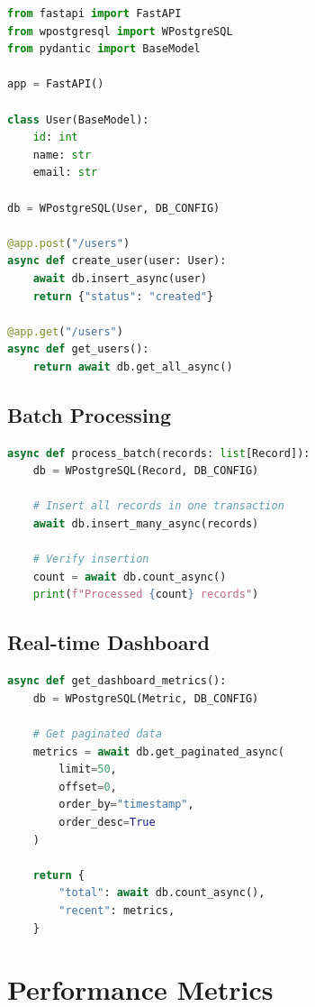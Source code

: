 \documentclass[12pt,a4paper]{report}
\begin{document}
\begin{lstlisting}[language=Python, caption=FastAPI Integration]
from fastapi import FastAPI
from wpostgresql import WPostgreSQL
from pydantic import BaseModel

app = FastAPI()

class User(BaseModel):
    id: int
    name: str
    email: str

db = WPostgreSQL(User, DB_CONFIG)

@app.post("/users")
async def create_user(user: User):
    await db.insert_async(user)
    return {"status": "created"}

@app.get("/users")
async def get_users():
    return await db.get_all_async()
\end{lstlisting}

\section{Batch Processing}

\begin{lstlisting}[language=Python, caption=Batch Processing]
async def process_batch(records: list[Record]):
    db = WPostgreSQL(Record, DB_CONFIG)
    
    # Insert all records in one transaction
    await db.insert_many_async(records)
    
    # Verify insertion
    count = await db.count_async()
    print(f"Processed {count} records")
\end{lstlisting}

\section{Real-time Dashboard}

\begin{lstlisting}[language=Python, caption=Dashboard Data]
async def get_dashboard_metrics():
    db = WPostgreSQL(Metric, DB_CONFIG)
    
    # Get paginated data
    metrics = await db.get_paginated_async(
        limit=50,
        offset=0,
        order_by="timestamp",
        order_desc=True
    )
    
    return {
        "total": await db.count_async(),
        "recent": metrics,
    }
\end{lstlisting}

\chapter{Performance Metrics}
\end{document}
